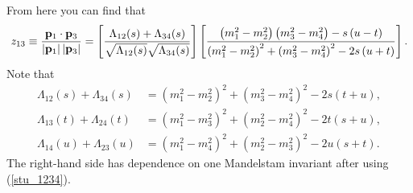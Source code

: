 From here you can find that
\begin{equation}
	z_{13} \equiv \frac{\mathbf{p}_{1} \cdot \mathbf{p}_{3}}{ \left\lvert \mathbf{p}_{1} \right\rvert \left\lvert \mathbf{p}_{3} \right\rvert } = \left[ \frac{\Lambda_{12}(s) + \Lambda_{34}(s)}{ \sqrt{\Lambda_{12}(s)} \sqrt{\Lambda_{34}(s)} } \right] \left[ 
	\frac{ \left( m_{1}^{2} - m_{2}^{2} \right) \left( m_{3}^{2} - m_{4}^{2} \right) - s \left(u - t\right) }{\left( m_{1}^{2} - m_{2}^{2} \right)^{2} +  \left( m_{3}^{2} - m_{4}^{2} \right)^{2} - 2s \left(u + t\right)} \right].
\end{equation}
Note that
\begin{align}
	\Lambda_{12}(s) + \Lambda_{34}(s) &= \left( m_{1}^{2} - m_{2}^{2} \right)^{2} +  \left( m_{3}^{2} - m_{4}^{2} \right)^{2} - 2s \left(t + u\right), \\
	\Lambda_{13}(t) + \Lambda_{24}(t) &= \left( m_{1}^{2} - m_{3}^{2} \right)^{2} +  \left( m_{2}^{2} - m_{4}^{2} \right)^{2} - 2t \left(s + u\right), \\
	\Lambda_{14}(u) + \Lambda_{23}(u) &= \left( m_{1}^{2} - m_{4}^{2} \right)^{2} +  \left( m_{2}^{2} - m_{3}^{2} \right)^{2} - 2u \left(s + t\right).
\end{align}
The right-hand side has dependence on one Mandelstam invariant after using (\ref{stu_1234}).
